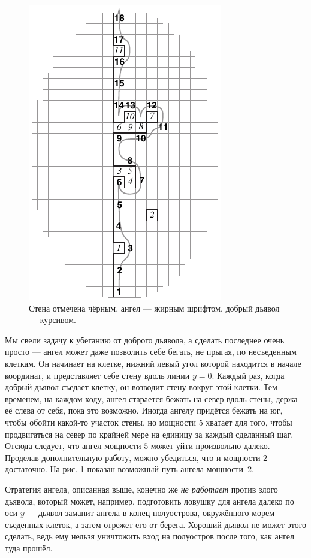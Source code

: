\begin{figure}[htb!]
\centering
\includegraphics[scale=1]{pics/angel}
\caption{Стена отмечена чёрным, ангел --- жирным шрифтом, добрый дьявол --- курсивом.}
\label{pic:angel}
\end{figure}

Мы свели задачу к убеганию от доброго дьявола, а сделать последнее очень просто ---
ангел может даже позволить себе бегать, не прыгая, по несъеденным клеткам.
Он начинает на клетке, нижний левый угол которой находится в начале координат, и представляет себе стену вдоль линии $y = 0$.
Каждый раз, когда добрый дьявол съедает клетку, он возводит стену вокруг этой клетки.
Тем временем, на каждом ходу, ангел старается бежать на север вдоль стены, держа её слева от себя, пока это возможно.
Иногда ангелу придётся бежать на юг, чтобы обойти какой-то участок стены, но мощности $5$ 
хватает для того, чтобы продвигаться на север по крайней мере на единицу за каждый сделанный шаг.
Отсюда следует, что ангел мощности $5$ может уйти произвольно далеко.
Проделав дополнительную работу, можно убедиться, что и мощности $2$ достаточно.
На рис. \ref{pic:angel} показан возможный путь ангела мощности~$2$.

Стратегия ангела, описанная выше, конечно же \emph{не работает} против злого дьявола, который может, например, подготовить ловушку для ангела далеко по оси $y$ --- дьявол заманит ангела в конец полуострова, окружённого морем съеденных клеток, а затем отрежет его от берега.
Хороший дьявол не может этого сделать, ведь ему нельзя уничтожить вход на полуостров после того, как ангел туда прошёл.

